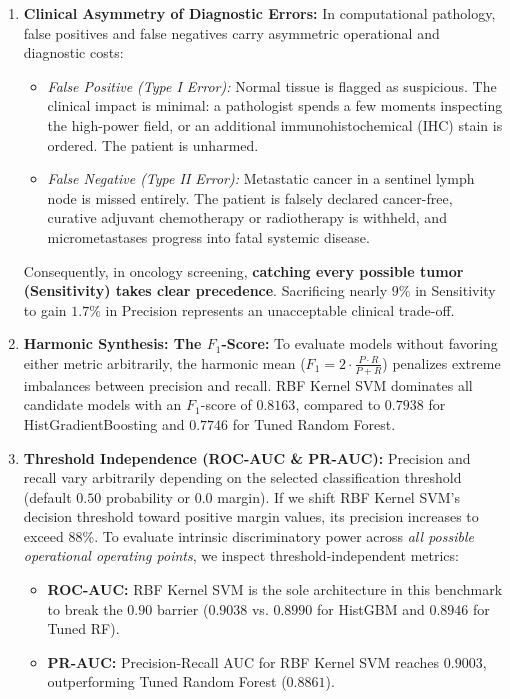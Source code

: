 \documentclass[11pt,a4paper]{article}
\begin{document}
\begin{enumerate}[leftmargin=*]
    \item \textbf{Clinical Asymmetry of Diagnostic Errors:}
    In computational pathology, false positives and false negatives carry asymmetric operational and diagnostic costs:
    \begin{itemize}[noitemsep]
        \item \textit{False Positive (Type I Error):} Normal tissue is flagged as suspicious. The clinical impact is minimal: a pathologist spends a few moments inspecting the high-power field, or an additional immunohistochemical (IHC) stain is ordered. The patient is unharmed.
        \item \textit{False Negative (Type II Error):} Metastatic cancer in a sentinel lymph node is missed entirely. The patient is falsely declared cancer-free, curative adjuvant chemotherapy or radiotherapy is withheld, and micrometastases progress into fatal systemic disease.
    \end{itemize}
    Consequently, in oncology screening, \textbf{catching every possible tumor (Sensitivity) takes clear precedence}. Sacrificing nearly $9\%$ in Sensitivity to gain $1.7\%$ in Precision represents an unacceptable clinical trade-off.

    \item \textbf{Harmonic Synthesis: The $F_1$-Score:}
    To evaluate models without favoring either metric arbitrarily, the harmonic mean ($F_1 = 2 \cdot \frac{P \cdot R}{P + R}$) penalizes extreme imbalances between precision and recall. RBF Kernel SVM dominates all candidate models with an $F_1$-score of $\mathbf{0.8163}$, compared to $0.7938$ for HistGradientBoosting and $0.7746$ for Tuned Random Forest.

    \item \textbf{Threshold Independence (ROC-AUC \& PR-AUC):}
    Precision and recall vary arbitrarily depending on the selected classification threshold (default $0.50$ probability or $0.0$ margin). If we shift RBF Kernel SVM's decision threshold toward positive margin values, its precision increases to exceed $88\%$. To evaluate intrinsic discriminatory power across \textit{all possible operational operating points}, we inspect threshold-independent metrics:
    \begin{itemize}[noitemsep]
        \item \textbf{ROC-AUC:} RBF Kernel SVM is the sole architecture in this benchmark to break the $0.90$ barrier ($\mathbf{0.9038}$ vs. $0.8990$ for HistGBM and $0.8946$ for Tuned RF).
        \item \textbf{PR-AUC:} Precision-Recall AUC for RBF Kernel SVM reaches $\mathbf{0.9003}$, outperforming Tuned Random Forest ($0.8861$).
    \end{itemize}
\end{enumerate}
\end{document}
